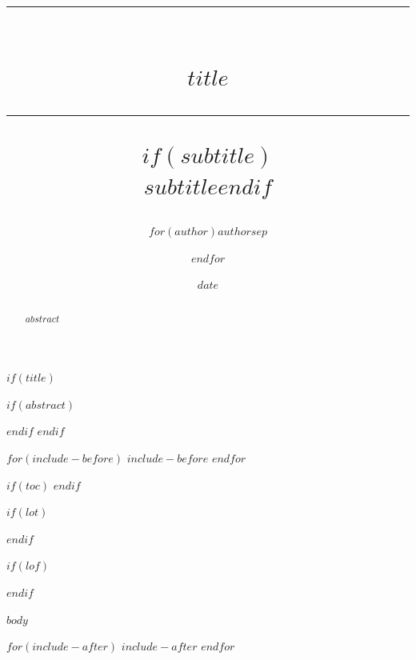 \documentclass[$if(fontsize)$$fontsize$,$endif$$if(lang)$$babel-lang$,$endif$$if(papersize)$$papersize$paper,$endif$$for(classoption)$$classoption$$sep$,$endfor$]{$documentclass$}
\title{
  \vspace{-2cm}
  {\color{JapanRed}\rule{\linewidth}{2pt}}\\[0.5cm]
  {\Huge\bfseries\sffamily\color{JapanNavy}$title$}\\[0.3cm]
  {\color{JapanRed}\rule{\linewidth}{2pt}}
  $if(subtitle)$\\[0.5cm]{\Large\sffamily\color{InkBlack}$subtitle$}$endif$
}
\author{$for(author)$$author$$sep$ \and $endfor$}
\date{\color{JapanNavy}\sffamily $date$}
\date{}
\begin{document}
$if(title)$
\maketitle
\thispagestyle{empty}
$if(abstract)$
\begin{abstract}
$abstract$
\end{abstract}
$endif$
$endif$

$for(include-before)$
$include-before$
$endfor$

$if(toc)$
{
\setcounter{tocdepth}{$if(toc-depth)$$toc-depth$$else$3$endif$}
\hypersetup{linkcolor=JapanNavy}
\tableofcontents
\newpage
}
$endif$

$if(lot)$
\listoftables
$endif$

$if(lof)$
\listoffigures
$endif$

$body$

$for(include-after)$
$include-after$
$endfor$
\end{document}
